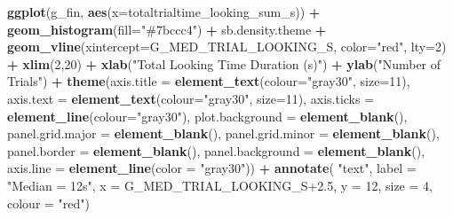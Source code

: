 \documentclass[
  doc,floatsintext]{apa6}
\newenvironment{Shaded}{\begin{snugshade}}{\end{snugshade}}
\newcommand{\AttributeTok}[1]{\textcolor[rgb]{0.13,0.29,0.53}{#1}}
\newcommand{\DecValTok}[1]{\textcolor[rgb]{0.00,0.00,0.81}{#1}}
\newcommand{\FloatTok}[1]{\textcolor[rgb]{0.00,0.00,0.81}{#1}}
\newcommand{\FunctionTok}[1]{\textcolor[rgb]{0.13,0.29,0.53}{\textbf{#1}}}
\newcommand{\NormalTok}[1]{#1}
\newcommand{\SpecialCharTok}[1]{\textcolor[rgb]{0.81,0.36,0.00}{\textbf{#1}}}
\newcommand{\StringTok}[1]{\textcolor[rgb]{0.31,0.60,0.02}{#1}}
\begin{document}
\begin{Shaded}
\begin{Highlighting}[]
\FunctionTok{ggplot}\NormalTok{(g\_fin, }\FunctionTok{aes}\NormalTok{(}\AttributeTok{x=}\NormalTok{totaltrialtime\_looking\_sum\_s)) }\SpecialCharTok{+}
  \FunctionTok{geom\_histogram}\NormalTok{(}\AttributeTok{fill=}\StringTok{"\#7bccc4"}\NormalTok{) }\SpecialCharTok{+}
\NormalTok{  sb.density.theme }\SpecialCharTok{+}
  \FunctionTok{geom\_vline}\NormalTok{(}\AttributeTok{xintercept=}\NormalTok{G\_MED\_TRIAL\_LOOKING\_S, }
             \AttributeTok{color=}\StringTok{"red"}\NormalTok{, }\AttributeTok{lty=}\DecValTok{2}\NormalTok{) }\SpecialCharTok{+}
  \FunctionTok{xlim}\NormalTok{(}\DecValTok{2}\NormalTok{,}\DecValTok{20}\NormalTok{) }\SpecialCharTok{+}
  \FunctionTok{xlab}\NormalTok{(}\StringTok{"Total Looking Time Duration (s)"}\NormalTok{) }\SpecialCharTok{+}
  \FunctionTok{ylab}\NormalTok{(}\StringTok{"Number of Trials"}\NormalTok{) }\SpecialCharTok{+} 
  \FunctionTok{theme}\NormalTok{(}\AttributeTok{axis.title =} \FunctionTok{element\_text}\NormalTok{(}\AttributeTok{colour=}\StringTok{"gray30"}\NormalTok{, }\AttributeTok{size=}\DecValTok{11}\NormalTok{),}
        \AttributeTok{axis.text =} \FunctionTok{element\_text}\NormalTok{(}\AttributeTok{colour=}\StringTok{"gray30"}\NormalTok{, }\AttributeTok{size=}\DecValTok{11}\NormalTok{),}
        \AttributeTok{axis.ticks =} \FunctionTok{element\_line}\NormalTok{(}\AttributeTok{colour=}\StringTok{"gray30"}\NormalTok{),}
        \AttributeTok{plot.background =} \FunctionTok{element\_blank}\NormalTok{(),}
        \AttributeTok{panel.grid.major =} \FunctionTok{element\_blank}\NormalTok{(),}
        \AttributeTok{panel.grid.minor =} \FunctionTok{element\_blank}\NormalTok{(),}
        \AttributeTok{panel.border =} \FunctionTok{element\_blank}\NormalTok{(),}
        \AttributeTok{panel.background =} \FunctionTok{element\_blank}\NormalTok{(),}
        \AttributeTok{axis.line =} \FunctionTok{element\_line}\NormalTok{(}\AttributeTok{color =} \StringTok{"gray30"}\NormalTok{))  }\SpecialCharTok{+}
  \FunctionTok{annotate}\NormalTok{(}
    \StringTok{"text"}\NormalTok{, }\AttributeTok{label =} \StringTok{"Median = 12s"}\NormalTok{,}
    \AttributeTok{x =}\NormalTok{ G\_MED\_TRIAL\_LOOKING\_S}\FloatTok{+2.5}\NormalTok{, }\AttributeTok{y =} \DecValTok{12}\NormalTok{, }\AttributeTok{size =} \DecValTok{4}\NormalTok{, }\AttributeTok{colour =} \StringTok{"red"}\NormalTok{)}
\end{Highlighting}
\end{Shaded}
\end{document}
